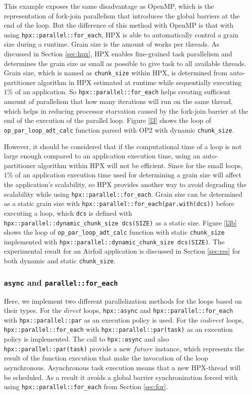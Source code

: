 \documentclass[conference]{IEEEtran}
\begin{document}
This example exposes the same disadvantage as OpenMP, which is the representation of fork-join parallelism that introduces the global barriers at the end of the loop. But the difference of this method with OpenMP is that with using \texttt{hpx::parallel::for\_each}, HPX is able to automatically control a grain size during a runtime. Grain size is the amount of works per threads. As discussed in Section \ref{sec:hpx}, HPX enables fine-grained task parallelism and determines the grain size as small as possible to give task to all available threads. Grain size, which is named as \texttt{chunk\_size} within HPX, is determined from auto-partitioner algorithm in HPX estimated at runtime while sequentially executing $1\%$ of an application. So \texttt{hpx::parallel::for\_each} helps creating sufficient amount of parallelism that how many iterations will run on the same thread, which helps in reducing processor starvation caused by the fork-join barrier at the end of the execution of the parallel loop.  Figure \ref{l3} shows the loop of \texttt{op\_par\_loop\_adt\_calc} function parsed with OP2 with dynamic \texttt{chunk\_size}. 

However, it should be considered that if the computational time of a loop is not large enough compared to an application execution time, using an auto-partitioner algorithm within HPX will not be efficient. Since for the small loops, $1\%$ of an application execution time used for determining a grain size will affect the application's scalability, so HPX provides another way to avoid degrading the scalability while using \texttt{hpx::parallel::for\_each}. Grain size can be determined as a static grain size with \texttt{hpx::parallel::for\_each(par.with(dcs))} before executing a loop, which \texttt{dcs} is defined with \texttt{hpx::parallel::dynamic\_chunk\_size dcs(SIZE)} as a static size.  Figure \ref{l3b} shows the loop of \texttt{op\_par\_loop\_adt\_calc} function with static \texttt{chunk\_size} implemented with \texttt{hpx::parallel::dynamic\_chunk\_size dcs(SIZE)}. The experimental result for an Airfoil application is discussed in Section \ref{sec:res} for both dynamic and static \texttt{chunk\_size}.

\subsubsection{\textbf{\texttt{async} and \texttt{parallel::for\_each}}}
\label{sec:async}

Here, we implement two different parallelization methods for the loops based on their types. For the $direct$ loops, \texttt{hpx::async} and \texttt{hpx::parallel::for\_each} with \texttt{hpx::parallel::par} as an execution policy is used. For  the $indirect$ loops,  \texttt{hpx::parallel::for\_each} with \texttt{hpx::parallel::par(task)} as an execution policy is implemented. The call to \texttt{hpx::async} and also \texttt{hpx::parallel::par(task)} provide a new $future$ instance, which represents the result of the function execution that make the invocation of the loop asynchronous. Asynchronous task execution means that a new HPX-thread will be scheduled. As a result it avoids a global barrier synchronization forced with using \texttt{hpx::parallel::for\_each} from Section \ref{sec:for}.
\end{document}
